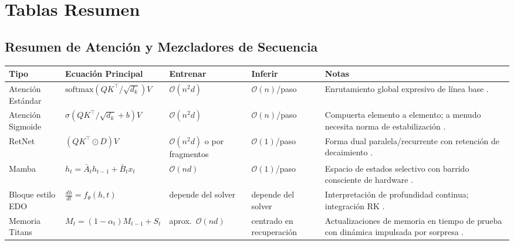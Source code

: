 \documentclass[11pt,a4paper]{article}
\begin{document}
\section{Tablas Resumen}
\label{sec:summary-tables}

\subsection{Resumen de Atención y Mezcladores de Secuencia}
\small
\begin{longtable}{p{2.4cm}p{3.2cm}p{2.0cm}p{2.0cm}p{4.8cm}}
\toprule
\textbf{Tipo} & \textbf{Ecuación Principal} & \textbf{Entrenar} & \textbf{Inferir} & \textbf{Notas} \\
\midrule
\endhead
Atención Estándar & $\text{softmax}(QK^\top/\sqrt{d_k})V$ & $\mathcal{O}(n^2d)$ & $\mathcal{O}(n)$/paso & Enrutamiento global expresivo de línea base \citep{vaswani_attention_2017}. \\
Atención Sigmoide & $\sigma(QK^\top/\sqrt{d_k}+b)V$ & $\mathcal{O}(n^2d)$ & $\mathcal{O}(n)$/paso & Compuerta elemento a elemento; a menudo necesita norma de estabilización \citep{ramapuram_theory_2024}. \\
RetNet & $(QK^\top\odot D)V$ & $\mathcal{O}(n^2d)$ o por fragmentos & $\mathcal{O}(1)$/paso & Forma dual paralela/recurrente con retención de decaimiento \citep{sun_retentive_2023}. \\
Mamba & $h_t=\bar{A}_t h_{t-1}+\bar{B}_t x_t$ & $\mathcal{O}(nd)$ & $\mathcal{O}(1)$/paso & Espacio de estados selectivo con barrido consciente de hardware \citep{gu_mamba_2023}. \\
Bloque estilo EDO & $\frac{dh}{dt}=f_\theta(h,t)$ & depende del solver & depende del solver & Interpretación de profundidad continua; integración RK \citep{zhang_continuous_2021}. \\
Memoria Titans & $M_t=(1-\alpha_t)M_{t-1}+S_t$ & aprox.\ $\mathcal{O}(nd)$ & centrado en recuperación & Actualizaciones de memoria en tiempo de prueba con dinámica impulsada por sorpresa \citep{behrouz_titans_2025}. \\
\bottomrule
\end{longtable}
\normalsize
\end{document}

